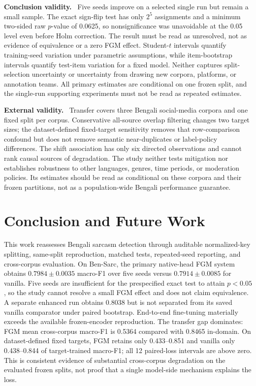 \documentclass{ieeeaccess}
\newcommand{\runin}[1]{\smallskip\noindent\textbf{#1}\ }
\begin{document}
\runin{Conclusion validity.} Five seeds improve on a selected single run but remain a small sample. The exact sign-flip test has only $2^5$ assignments and a minimum two-sided raw $p$-value of 0.0625, so nonsignificance was unavoidable at the 0.05 level even before Holm correction. The result must be read as unresolved, not as evidence of equivalence or a zero FGM effect. Student-$t$ intervals quantify training-seed variation under parametric assumptions, while item-bootstrap intervals quantify test-item variation for a fixed model. Neither captures split-selection uncertainty or uncertainty from drawing new corpora, platforms, or annotation teams. All primary estimates are conditional on one frozen split, and the single-run supporting experiments must not be read as repeated estimates.

\runin{External validity.} Transfer covers three Bengali social-media corpora and one fixed split per corpus. Conservative all-source overlap filtering changes two target sizes; the dataset-defined fixed-target sensitivity removes that row-comparison confound but does not remove semantic near-duplicates or label-policy differences. The shift association has only six directed observations and cannot rank causal sources of degradation. The study neither tests mitigation nor establishes robustness to other languages, genres, time periods, or moderation policies. Its estimates should be read as conditional on these corpora and their frozen partitions, not as a population-wide Bengali performance guarantee.

\section{Conclusion and Future Work}
\label{sec:conclusion}

This work reassesses Bengali sarcasm detection through auditable normalized-key splitting, same-split reproduction, matched tests, repeated-seed reporting, and cross-corpus evaluation. On Ben-Sarc, the primary native-head FGM system obtains $0.7984\pm0.0035$ macro-F1 over five seeds versus $0.7914\pm0.0085$ for vanilla. Five seeds are insufficient for the prespecified exact test to attain $p<0.05$, so the study cannot resolve a small FGM effect and does not claim equivalence. A separate enhanced run obtains 0.8038 but is not separated from its saved vanilla comparator under paired bootstrap. End-to-end fine-tuning materially exceeds the available frozen-encoder reproduction. The transfer gap dominates: FGM mean cross-corpus macro-F1 is 0.5364 compared with 0.8465 in-domain. On dataset-defined fixed targets, FGM retains only 0.433--0.851 and vanilla only 0.438--0.844 of target-trained macro-F1; all 12 paired-loss intervals are above zero. This is consistent evidence of substantial cross-corpus degradation on the evaluated frozen splits, not proof that a single model-side mechanism explains the loss.
\end{document}

